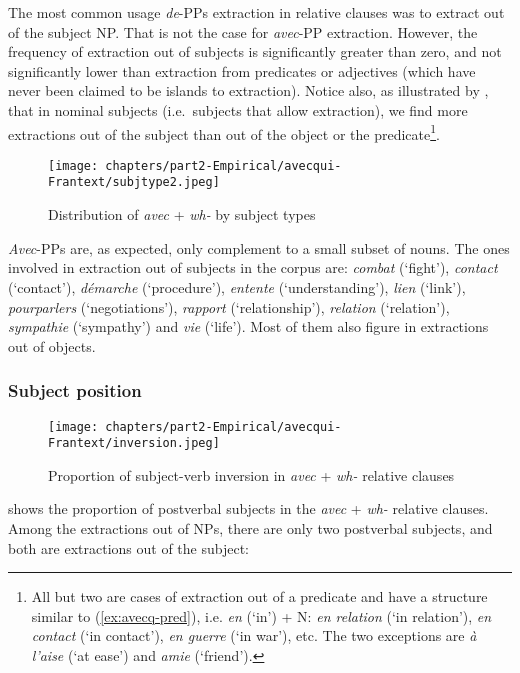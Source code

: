 The most common usage \emph{de}-PPs extraction in relative clauses was to extract out of the subject NP. That is not the case for \emph{avec}-PP extraction. However, the frequency of extraction out of subjects is significantly greater than zero, and not significantly lower than extraction from predicates or adjectives (which have never been claimed to be islands to extraction). Notice also, as illustrated by , that in nominal subjects (i.e.\ subjects that allow extraction), we find more extractions out of the subject than out of the object or the predicate\footnote{All but two are cases of extraction out of a predicate and have a structure similar to (\ref{ex:avecq-pred}), i.e. \emph{en} (`in') + N: \emph{en relation} (`in relation'), \emph{en contact} (`in contact'), \emph{en guerre} (`in war'), etc. The two exceptions are \emph{à l'aise} (`at ease') and \emph{amie} (`friend').}. 

\begin{figure}
    \centering
    \texttt{[image: chapters/part2-Empirical/avecqui-Frantext/subjtype2.jpeg]}
    \caption{Distribution of \emph{avec} + \emph{wh-} by subject types}
    \label{fig:avecq-subjtype}
\end{figure}

\emph{Avec}-PPs are, as expected, only complement to a small subset of nouns. The ones involved in extraction out of subjects in the corpus are: \emph{combat} (`fight'), \emph{contact} (`contact'), \emph{démarche} (`procedure'), \emph{entente} (`understanding'), \emph{lien} (`link'), \emph{pourparlers} (`negotiations'), \emph{rapport} (`relationship'), \emph{relation} (`relation'), \emph{sympathie} (`sympathy') and \emph{vie} (`life'). Most of them also figure in extractions out of objects. 


\subsubsection{Subject position}

    \begin{figure}
    \centering
    \texttt{[image: chapters/part2-Empirical/avecqui-Frantext/inversion.jpeg]}
    \caption{Proportion of subject-verb inversion in \emph{avec} + \emph{wh-} relative clauses}
    \label{fig:avecq-inv}
    \end{figure}
shows the proportion of postverbal subjects in the \emph{avec} + \emph{wh-} relative clauses. Among the extractions out of NPs, there are only two postverbal subjects, and both are extractions out of the subject:

